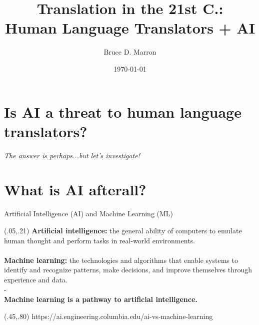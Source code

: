 \documentclass{beamer}
\title{Translation in the 21st C.: \\
Human Language Translators + AI}
\date{\today}
\author{Bruce D. Marron}
\begin{document}
\begin{frame}
  \titlepage
\end{frame}

\section{Is AI a threat to human language translators?}

\begin{frame}

\begin{center}
\large \textit{The answer is perhaps...but let's investigate!}
\end{center}

\end{frame}

\section{What is AI afterall?}

\begin{frame}{Artificial Intelligence (AI) and Machine Learning (ML)}

\begin{textblock}{1}(.05,.21)
  \normalsize {\textbf{Artificial intelligence:} the general ability of computers to emulate human thought and perform tasks in real-world environments.\\~\\
  
\textbf{Machine learning:} the technologies and algorithms that enable systems to identify and recognize patterns, make decisions, and improve themselves through experience and data. \\-\\

\textbf{Machine learning is a pathway to artificial intelligence.}}
  
\end{textblock}

\begin{textblock}{1}(.45,.80)
  \tiny{https://ai.engineering.columbia.edu/ai-vs-machine-learning}
\end{textblock}
\end{frame}
\end{document}
